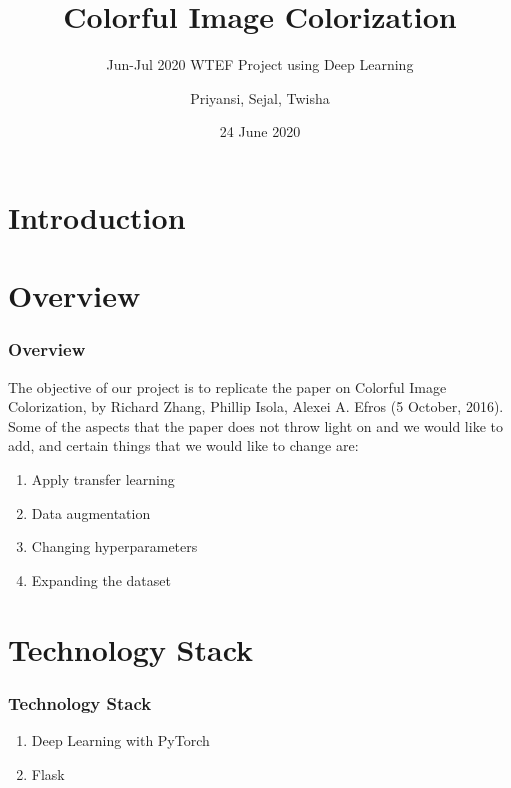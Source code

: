 \documentclass[16pt, subsection=false]{beamer}
\title{Colorful Image Colorization}
\subtitle{Jun-Jul 2020 WTEF Project using Deep Learning}
\author[Team 9]{Priyansi, Sejal, Twisha}
\date{24 June 2020}
\begin{document}
\section{Introduction}
\begin{frame}
	\titlepage
\end{frame}

\section{Overview}
\begin{frame}
	\frametitle{Overview}
	The objective of our project is to replicate the paper on Colorful Image Colorization, by Richard Zhang,
	Phillip Isola, Alexei A. Efros (5 October, 2016). \\
	Some of the aspects that the paper does not throw light on and we would like to add, and certain things that we
	would like to change are: \\
	\begin{enumerate}
		\item Apply transfer learning
		\item Data augmentation
		\item Changing hyperparameters
		\item Expanding the dataset
	\end{enumerate}
\end{frame}

\section{Technology Stack}
\begin{frame}
	\frametitle{Technology Stack}
	\begin{enumerate}
		\item Deep Learning with PyTorch \\
		\item Flask
	\end{enumerate}
\end{frame}
\end{document}
